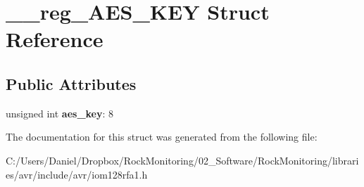 \hypertarget{struct____reg___a_e_s___k_e_y}{}\section{\+\_\+\+\_\+reg\+\_\+\+A\+E\+S\+\_\+\+K\+EY Struct Reference}
\label{struct____reg___a_e_s___k_e_y}
\subsection*{Public Attributes}
\begin{DoxyCompactItemize}
\item 
unsigned int {\bfseries aes\+\_\+key}\+: 8\hypertarget{struct____reg___a_e_s___k_e_y_a44bda42cd6bffae296369af8955d0006}{}\label{struct____reg___a_e_s___k_e_y_a44bda42cd6bffae296369af8955d0006}

\end{DoxyCompactItemize}


The documentation for this struct was generated from the following file\+:\begin{DoxyCompactItemize}
\item 
C\+:/\+Users/\+Daniel/\+Dropbox/\+Rock\+Monitoring/02\+\_\+\+Software/\+Rock\+Monitoring/libraries/avr/include/avr/iom128rfa1.\+h\end{DoxyCompactItemize}
